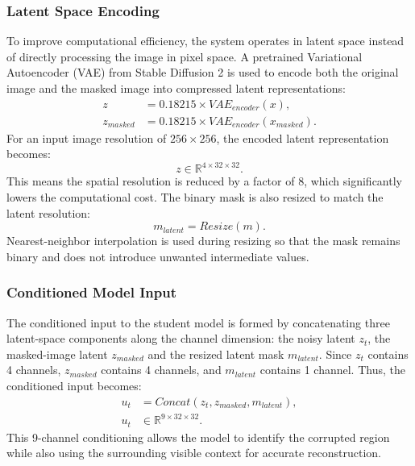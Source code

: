 \documentclass[journal]{IEEEtran}
\begin{document}
\subsubsection{Latent Space Encoding}
To improve computational efficiency, the system operates in latent space instead of directly processing the image in pixel space. A pretrained Variational Autoencoder (VAE) from Stable Diffusion 2 is used to encode both the original image and the masked image into compressed latent representations:
\begin{align}
z &= 0.18215\times VAE_{encoder}(x),\\
z_{masked} &= 0.18215\times VAE_{encoder}(x_{masked}).
\end{align}
For an input image resolution of $256\times256$, the encoded latent representation becomes:
\begin{equation}
z\in\mathbb{R}^{4\times32\times32}.
\end{equation}
This means the spatial resolution is reduced by a factor of 8, which significantly lowers the computational cost. The binary mask is also resized to match the latent resolution:
\begin{equation}
m_{latent}=Resize(m).
\end{equation}
Nearest-neighbor interpolation is used during resizing so that the mask remains binary and does not introduce unwanted intermediate values.

\subsubsection{Conditioned Model Input}
The conditioned input to the student model is formed by concatenating three latent-space components along the channel dimension: the noisy latent $z_t$, the masked-image latent $z_{masked}$ and the resized latent mask $m_{latent}$. Since $z_t$ contains 4 channels, $z_{masked}$ contains 4 channels, and $m_{latent}$ contains 1 channel. Thus, the conditioned input becomes:
\begin{align}
u_t &= Concat(z_t,z_{masked},m_{latent}),\\
u_t &\in \mathbb{R}^{9\times32\times32}.
\end{align}
This 9-channel conditioning allows the model to identify the corrupted region while also using the surrounding visible context for accurate reconstruction.
\end{document}
